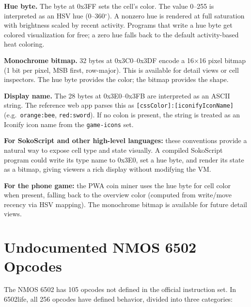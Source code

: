 \documentclass{article}
\begin{document}
\textbf{Hue byte.} The byte at 0x3FF sets the cell's color. The value
0--255 is interpreted as an HSV hue (0--360$^\circ$). A nonzero hue is
rendered at full saturation with brightness scaled by recent activity.
Programs that write a hue byte get colored visualization for free; a
zero hue falls back to the default activity-based heat coloring.

\textbf{Monochrome bitmap.} 32 bytes at 0x3C0--0x3DF encode a
16$\times$16 pixel bitmap (1 bit per pixel, MSB first, row-major).
This is available for detail views or cell inspectors. The hue byte
provides the color; the bitmap provides the shape.

\textbf{Display name.} The 28 bytes at 0x3E0--0x3FB are interpreted as an ASCII
string. The reference web app parses this as \texttt{[cssColor]:[iconifyIconName]}
(e.g.\ \texttt{orange:bee}, \texttt{red:sword}). If no colon is present, the
string is treated as an Iconify icon name from the \texttt{game-icons} set.

\textbf{For SokoScript and other high-level languages:} these conventions provide
a natural way to expose cell type and state visually. A compiled SokoScript program
could write its type name to 0x3E0, set a hue byte, and render its state as a
bitmap, giving viewers a rich display without modifying the VM.

\textbf{For the phone game:} the PWA coin miner uses the hue byte for cell color
when present, falling back to the overview color (computed from write/move recency
via HSV mapping). The monochrome bitmap is available for future detail views.

\section{Undocumented NMOS 6502 Opcodes}

The NMOS 6502 has 105 opcodes not defined in the official instruction set.
In 6502life, all 256 opcodes have defined behavior, divided into three categories:
\end{document}
